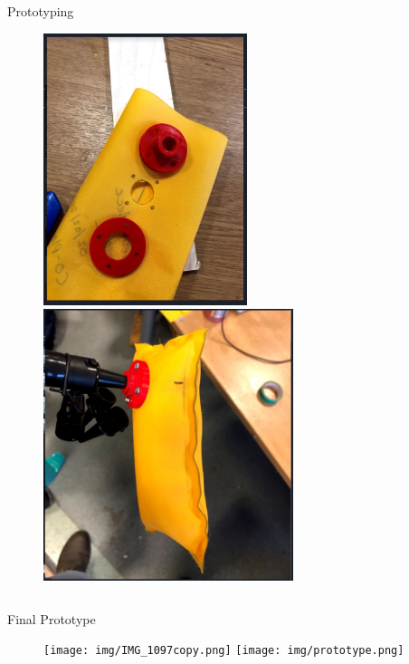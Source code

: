 \documentclass[final]{beamer}
\newlength{\onecolwid}
\newlength{\twocolwid}
\begin{document}
\begin{frame}
\begin{columns}[t]
\begin{column}{\twocolwid}
\begin{columns}[t,totalwidth=\twocolwid]
\begin{column}{\onecolwid}
\begin{block}{Prototyping}
\begin{figure}
\includegraphics[height=300, width=0.5\linewidth]{img/Proto6.PNG}
\includegraphics[height=300, width=0.5\linewidth]{img/Proto7.PNG}
\end{figure}



\end{block}


\end{column} %

\end{columns} %
\begin{block}{Final Prototype}
\begin{figure}
\texttt{[image: img/IMG\_1097copy.png]}
\texttt{[image: img/prototype.png]}
\end{figure}



\end{block}
\end{column}
\end{columns}
\end{frame}
\end{document}
